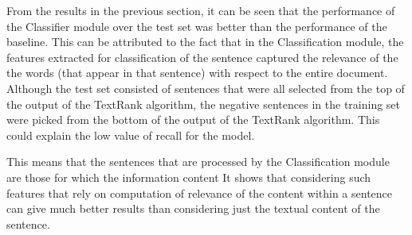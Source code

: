 From the results in the previous section, it can be seen that the performance of the Classifier module over the test set was better than the performance of the baseline.
This can be attributed to the fact that in the Classification module, the features extracted for classification of the sentence captured the relevance of the the words (that appear in that sentence) with respect to the entire document.
Although the test set consisted of sentences that were all selected from the top of the output of the TextRank algorithm, the negative sentences in the training set were picked from the bottom of the output of the TextRank algorithm.
This could explain the low value of recall for the model.

This means that the sentences that are processed by the Classification module are those for which the information content 
It shows that considering such features that rely on computation of relevance of the content within a sentence can give much better results than considering just the textual content of the sentence.
